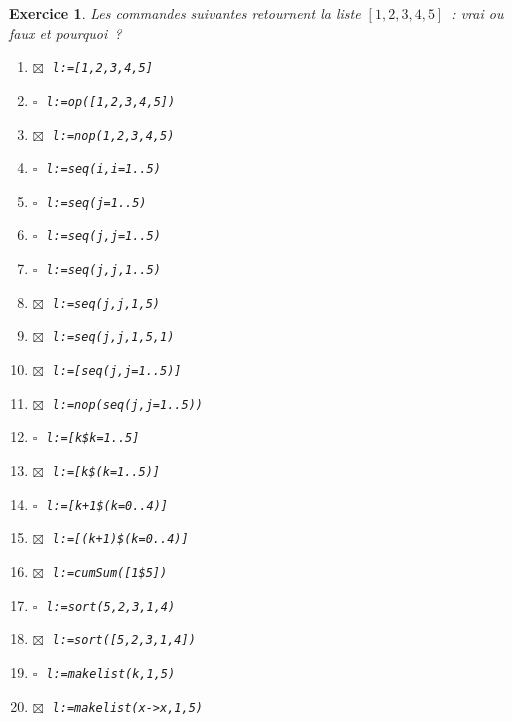 \documentclass{article}
\newcommand{\faux}{$\square\;$}
\newcommand{\vrai}{$\boxtimes\;$}
\newcommand{\itemf}{\item\faux}
\newcommand{\itemvv}{\item\vrai}
\newtheorem{exo}{Exercice}[section]
\begin{document}
\begin{exo}{\rm
Les commandes suivantes retournent la liste
$[1,2,3,4,5]$~: 
vrai ou faux et pourquoi~?
\begin{enumerate}
\itemvv
\verb|l:=[1,2,3,4,5]|
\itemf
\verb|l:=op([1,2,3,4,5])|
\itemvv
\verb|l:=nop(1,2,3,4,5)|
\itemf
\verb|l:=seq(i,i=1..5)|
\itemf
\verb|l:=seq(j=1..5)|
\itemf
\verb|l:=seq(j,j=1..5)|
\itemf
\verb|l:=seq(j,j,1..5)|
\itemvv
\verb|l:=seq(j,j,1,5)|
\itemvv
\verb|l:=seq(j,j,1,5,1)|
\itemvv
\verb|l:=[seq(j,j=1..5)]|
\itemvv
\verb|l:=nop(seq(j,j=1..5))|
\itemf
\verb|l:=[k$k=1..5]|
\itemvv
\verb|l:=[k$(k=1..5)]|
\itemf
\verb|l:=[k+1$(k=0..4)]|
\itemvv
\verb|l:=[(k+1)$(k=0..4)]|
\itemvv
\verb|l:=cumSum([1$5])|
\itemf
\verb|l:=sort(5,2,3,1,4)|
\itemvv
\verb|l:=sort([5,2,3,1,4])|
\itemf
\verb|l:=makelist(k,1,5)|
\itemvv
\verb|l:=makelist(x->x,1,5)|
\end{enumerate}
}\end{exo}
\end{document}
